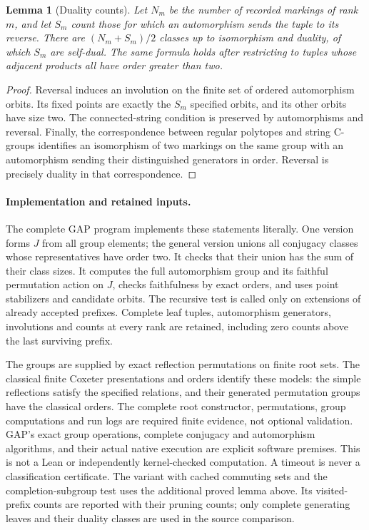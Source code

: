 \documentclass[11pt,a4paper]{article}
\newtheorem{lemma}[theorem]{Lemma}
\begin{document}
\begin{lemma}[Duality counts]
Let $N_m$ be the number of recorded markings of rank $m$, and let $S_m$
count those for which an automorphism sends the tuple to its reverse.
There are $(N_m+S_m)/2$ classes up to isomorphism and duality, of which
$S_m$ are self-dual. The same formula holds after restricting to tuples
whose adjacent products all have order greater than two.
\end{lemma}
\begin{proof}
Reversal induces an involution on the finite set of ordered automorphism
orbits. Its fixed points are exactly the $S_m$ specified orbits, and its
other orbits have size two. The connected-string condition is preserved
by automorphisms and reversal. Finally, the correspondence between regular
polytopes and string C-groups identifies an isomorphism of two markings on
the same group with an automorphism sending their distinguished generators
in order. Reversal is precisely duality in that correspondence.
\end{proof}

\paragraph{Implementation and retained inputs.}
The complete GAP program implements these statements literally. One version
forms $J$ from all group elements; the general version unions all conjugacy
classes whose representatives have order two. It checks that their union
has the sum of their class sizes. It computes the full automorphism group
and its faithful permutation action on $J$, checks faithfulness by exact
orders, and uses point stabilizers and candidate orbits. The recursive test
is called only on extensions of already accepted prefixes. Complete leaf
tuples, automorphism generators, involutions and counts at every rank are
retained, including zero counts above the last surviving prefix.

The groups are supplied by exact reflection permutations on finite root
sets. The classical finite Coxeter presentations and orders identify these
models: the simple reflections satisfy the specified relations, and their
generated permutation groups have the classical orders. The complete root
constructor, permutations, group computations and run logs are required
finite evidence, not optional validation. GAP's exact group operations,
complete conjugacy and automorphism algorithms, and their actual native
execution are explicit software premises. This is not a Lean or independently
kernel-checked computation. A timeout is never a classification certificate.
The variant with cached commuting sets and the completion-subgroup test
uses the additional proved lemma above. Its visited-prefix counts are
reported with their pruning counts; only complete generating leaves and
their duality classes are used in the source comparison.
\end{document}

